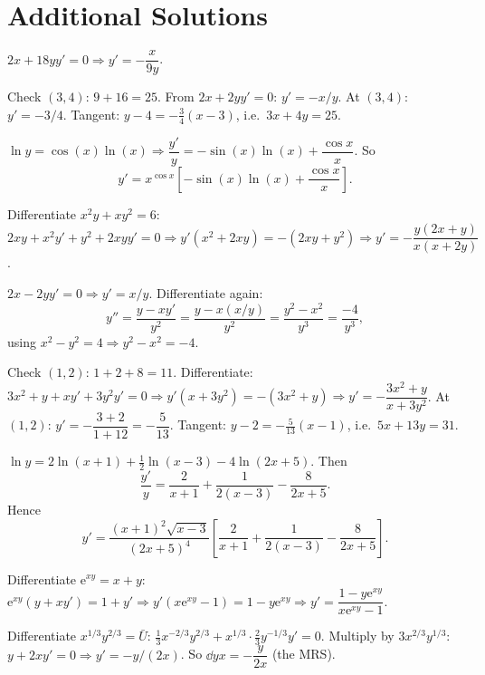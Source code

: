 \section{Additional Solutions}

\begin{solutions}
  \item $2x+18yy'=0\Rightarrow y'=-\dfrac{x}{9y}$.

  \item Check $(3,4)$: $9+16=25$. From $2x+2yy'=0$: $y'=-x/y$. At
        $(3,4)$: $y'=-3/4$. Tangent: $y-4=-\tfrac34(x-3)$, i.e.\
        $3x+4y=25$.

  \item $\ln y=\cos(x)\ln(x)\Rightarrow\dfrac{y'}{y}
        =-\sin(x)\ln(x)+\dfrac{\cos x}{x}$. So
        \[
          y'=x^{\cos x}\left[-\sin(x)\ln(x)+\frac{\cos x}{x}\right] .
        \]

  \item Differentiate $x^{2}y+xy^{2}=6$: $2xy+x^{2}y'+y^{2}+2xyy'=0
        \Rightarrow y'(x^{2}+2xy)=-(2xy+y^{2})
        \Rightarrow y'=-\dfrac{y(2x+y)}{x(x+2y)}$.

  \item $2x-2yy'=0\Rightarrow y'=x/y$. Differentiate again:
        \[
          y''=\frac{y-xy'}{y^{2}}=\frac{y-x(x/y)}{y^{2}}
             =\frac{y^{2}-x^{2}}{y^{3}}=\frac{-4}{y^{3}},
        \]
        using $x^{2}-y^{2}=4\Rightarrow y^{2}-x^{2}=-4$.

  \item Check $(1,2)$: $1+2+8=11$. Differentiate:
        $3x^{2}+y+xy'+3y^{2}y'=0\Rightarrow y'(x+3y^{2})=-(3x^{2}+y)
        \Rightarrow y'=-\dfrac{3x^{2}+y}{x+3y^{2}}$. At $(1,2)$:
        $y'=-\dfrac{3+2}{1+12}=-\dfrac{5}{13}$. Tangent:
        $y-2=-\tfrac{5}{13}(x-1)$, i.e.\ $5x+13y=31$.

  \item $\ln y=2\ln(x+1)+\tfrac12\ln(x-3)-4\ln(2x+5)$. Then
        \[
          \frac{y'}{y}=\frac{2}{x+1}+\frac{1}{2(x-3)}-\frac{8}{2x+5} .
        \]
        Hence
        \[
          y'=\frac{(x+1)^{2}\sqrt{x-3}}{(2x+5)^{4}}
             \left[\frac{2}{x+1}+\frac{1}{2(x-3)}-\frac{8}{2x+5}\right] .
        \]

  \item Differentiate $\mathrm{e}^{xy}=x+y$:
        $\mathrm{e}^{xy}(y+xy')=1+y'\Rightarrow
        y'(x\mathrm{e}^{xy}-1)=1-y\mathrm{e}^{xy}\Rightarrow
        y'=\dfrac{1-y\mathrm{e}^{xy}}{x\mathrm{e}^{xy}-1}$.

  \item Differentiate $x^{1/3}y^{2/3}=\bar U$:
        $\tfrac13x^{-2/3}y^{2/3}+x^{1/3}\cdot\tfrac23y^{-1/3}y'=0$.
        Multiply by $3x^{2/3}y^{1/3}$: $y+2xy'=0\Rightarrow y'=-y/(2x)$.
        So $\dd{y}{x}=-\dfrac{y}{2x}$ (the MRS).


\end{solutions}
